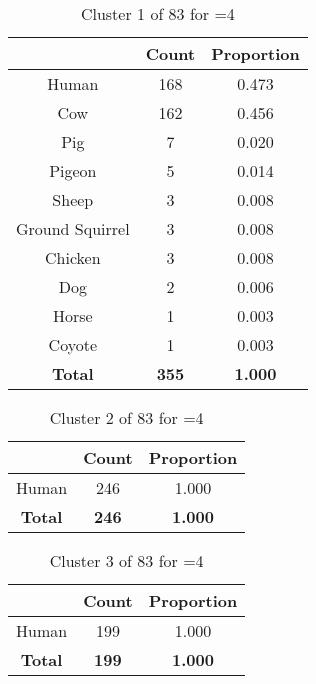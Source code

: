 \begin{table}[ht!]
\centering
\begin{tabular}{|c|c|c|}
\hline
\bf \Spec{} &\bf Count &\bf Proportion\\ \hline \hline
Human & 168 & 0.473\\ \hline
Cow & 162 & 0.456\\ \hline
Pig & 7 & 0.020\\ \hline
Pigeon & 5 & 0.014\\ \hline
Sheep & 3 & 0.008\\ \hline
Ground Squirrel & 3 & 0.008\\ \hline
Chicken & 3 & 0.008\\ \hline
Dog & 2 & 0.006\\ \hline
Horse & 1 & 0.003\\ \hline
Coyote & 1 & 0.003\\ \hline
\hline
\bf Total & \bf 355 & \bf 1.000\\ \hline
\end{tabular}
\label{tab:cluster:1:4}
\caption{Cluster 1 of 83 for \minneigh{}=4}
\end{table}

\begin{table}[ht!]
\centering
\begin{tabular}{|c|c|c|}
\hline
\bf \Spec{} &\bf Count &\bf Proportion\\ \hline \hline
Human & 246 & 1.000\\ \hline
\hline
\bf Total & \bf 246 & \bf 1.000\\ \hline
\end{tabular}
\label{tab:cluster:2:4}
\caption{Cluster 2 of 83 for \minneigh{}=4}
\end{table}

\begin{table}[ht!]
\centering
\begin{tabular}{|c|c|c|}
\hline
\bf \Spec{} &\bf Count &\bf Proportion\\ \hline \hline
Human & 199 & 1.000\\ \hline
\hline
\bf Total & \bf 199 & \bf 1.000\\ \hline
\end{tabular}
\label{tab:cluster:3:4}
\caption{Cluster 3 of 83 for \minneigh{}=4}
\end{table}

